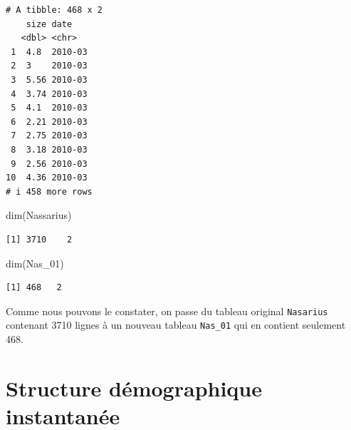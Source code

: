\documentclass[
  french,
  a4paper,
  DIV=11,
  numbers=noendperiod,
  oneside]{scrreprt}
\newenvironment{Shaded}{}{}
\newcommand{\FunctionTok}[1]{\textcolor[rgb]{0.44,0.26,0.76}{#1}}
\newcommand{\NormalTok}[1]{\textcolor[rgb]{0.14,0.16,0.18}{#1}}
\begin{document}
\begin{tcolorbox}
\begin{verbatim}
# A tibble: 468 x 2
    size date   
   <dbl> <chr>  
 1  4.8  2010-03
 2  3    2010-03
 3  5.56 2010-03
 4  3.74 2010-03
 5  4.1  2010-03
 6  2.21 2010-03
 7  2.75 2010-03
 8  3.18 2010-03
 9  2.56 2010-03
10  4.36 2010-03
# i 458 more rows
\end{verbatim}


\begin{Shaded}
\begin{Highlighting}[]
\FunctionTok{dim}\NormalTok{(Nassarius)}
\end{Highlighting}
\end{Shaded}

\begin{verbatim}
[1] 3710    2
\end{verbatim}

\begin{Shaded}
\begin{Highlighting}[]
\FunctionTok{dim}\NormalTok{(Nas\_01)}
\end{Highlighting}
\end{Shaded}

\begin{verbatim}
[1] 468   2
\end{verbatim}


Comme nous pouvons le constater, on passe du tableau original
\texttt{Nasarius} contenant 3710 lignes à un nouveau tableau
\texttt{Nas\_01} qui en contient seulement 468.

\section{Structure démographique
instantanée}\label{structure-duxe9mographique-instantanuxe9e}


\end{tcolorbox}
\end{document}
